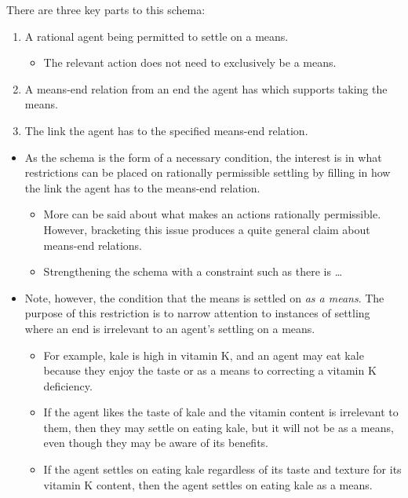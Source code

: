\documentclass[10pt]{article}
\newcommand{\hand}{\ding{43}}
\begin{document}
There are three key parts to this schema:
\begin{enumerate}[label=\arabic*., ref=(\arabic*)]
\item A rational agent being permitted to settle on a means.
  \begin{itemize}
  \item The relevant action does not need to exclusively be a means.
  \end{itemize}
\item A means-end relation from an end the agent has which supports taking the means.
\item The link the agent has to the specified means-end relation.
\end{enumerate}

\begin{itemize}
\item[\hand] As the schema is the form of a necessary condition, the interest is in what restrictions can be placed on rationally permissible settling by filling in how the link the agent has to the means-end relation.
  \begin{itemize}
  \item More can be said about what makes an actions rationally permissible.
    However, bracketing this issue produces a quite general claim about means-end relations.
  \item {\color{red} Strengthening the schema with a constraint such as there is \dots}
  \end{itemize}
\item Note, however, the condition that the means is settled on \emph{as a means}.
  The purpose of this restriction is to narrow attention to instances of settling where an end is irrelevant to an agent's settling on a means.
  \begin{itemize}
  \item For example, kale is high in vitamin K, and an agent may eat kale because they enjoy the taste or as a means to correcting a vitamin K deficiency.
  \item If the agent likes the taste of kale and the vitamin content is irrelevant to them, then they may settle on eating kale, but it will not be as a means, even though they may be aware of its benefits.
  \item If the agent settles on eating kale regardless of its taste and texture for its vitamin K content, then the agent settles on eating kale as a means.
  \end{itemize}
\end{itemize}
\end{document}
